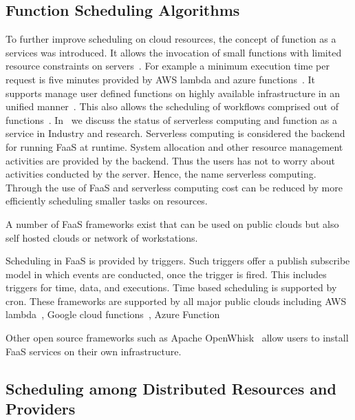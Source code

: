 \documentclass[final,5p,times,twocolumn]{elsarticle}
\begin{document}







\subsection{Function Scheduling Algorithms}
\label{sec:faas}



To further improve scheduling on cloud resources, the concept of
function as a services was introduced.  It allows the invocation of
small functions with limited resource constraints on
servers~\cite{lasbook}. For example a minimum execution time per
request is five minutes provided by AWS lambda and azure
functions~\cite{ServerlessComputing2018}. It supports manage user
defined functions on highly available infrastructure in an unified
manner~\cite{nastic2017serverless}. This also allows the scheduling of
workflows comprised out of
functions~\cite{alqaryouti2018serverless}. In~\cite{fox2017status} we
discuss the status of serverless computing and function as a service
in Industry and research.  Serverless computing is considered the
backend for running FaaS at runtime. System allocation and other
resource management activities are provided by the backend. Thus the
users has not to worry about activities conducted by the
server. Hence, the name serverless computing. Through the use of FaaS
and serverless computing cost can be reduced by more efficiently
scheduling smaller tasks on resources.

A number of FaaS frameworks exist that can be used on public clouds
but also self hosted clouds or network of workstations.

Scheduling in FaaS is provided by triggers. Such triggers offer a
publish subscribe model in which events are conducted, once the
trigger is fired. This includes triggers for time, data, and
executions. Time based scheduling is supported by cron.  These
frameworks are supported by all major public clouds including AWS
lambda~\cite{AWSlambda2018}, Google cloud
functions~\cite{GoogleCF2018}, Azure Function~\cite{Azure2018}

Other open source frameworks such as Apache
OpenWhisk~\cite{OpenWhisk2018} allow users to install FaaS services on
their own infrastructure.


\subsection{Scheduling among Distributed Resources and Providers}
\label{sec:distributed}
\end{document}
